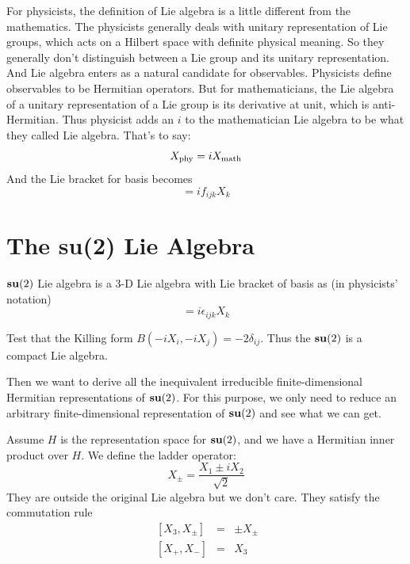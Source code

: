 \documentclass[12pt]{book}
\begin{document}
	For physicists, the definition of Lie algebra is a little different from the mathematics. The physicists generally deals with unitary representation of Lie groups, which acts on a Hilbert space with definite physical meaning. So they generally don't distinguish between a Lie group and its unitary representation. And Lie algebra enters as a natural candidate for observables. Physicists define observables to be Hermitian operators. But for mathematicians, the Lie algebra of a unitary representation of a Lie group is its derivative at unit, which is anti-Hermitian. Thus physicist adds an $i$ to the mathematician Lie algebra to be what they called Lie algebra. That's to say:
	\begin{equation}
		X_{\rm phy}=iX_{\rm math}
	\end{equation}
	And the Lie bracket for basis becomes
	\begin{equation}
		[X_i,X_j]=if_{ijk}X_k
	\end{equation}
	\section{The su(2) Lie Algebra}
	${\bf su}(2)$ Lie algebra is a 3-D Lie algebra with Lie bracket of basis as (in physicists' notation) 
	\begin{equation}
		[X_i,X_j]=i\epsilon_{ijk}X_k
	\end{equation}
	
	
		Test that the Killing form $B(-iX_i,-iX_j)=-2\delta_{ij}$. Thus the ${\bf su}(2)$ is a compact Lie algebra.
	
	Then we want to derive all the inequivalent irreducible finite-dimensional Hermitian representations of ${\bf su}(2)$. For this purpose, we only need to reduce an arbitrary finite-dimensional representation of ${\bf su}(2)$ and see what we can get. 
	
	Assume $H$ is the representation space for ${\bf su}(2)$, and we have a Hermitian inner product over $H$. We define the ladder operator:
	\begin{equation}
		X_\pm=\frac {X_1\pm iX_2}{\sqrt 2}
	\end{equation}
	They are outside the original Lie algebra but we don't care. They satisfy the commutation rule
	\begin{eqnarray}
		\ [X_3,X_\pm]&=&\pm X_\pm\\
		\ [X_+,X_-]&=&X_3
	\end{eqnarray}
	
\end{document}
